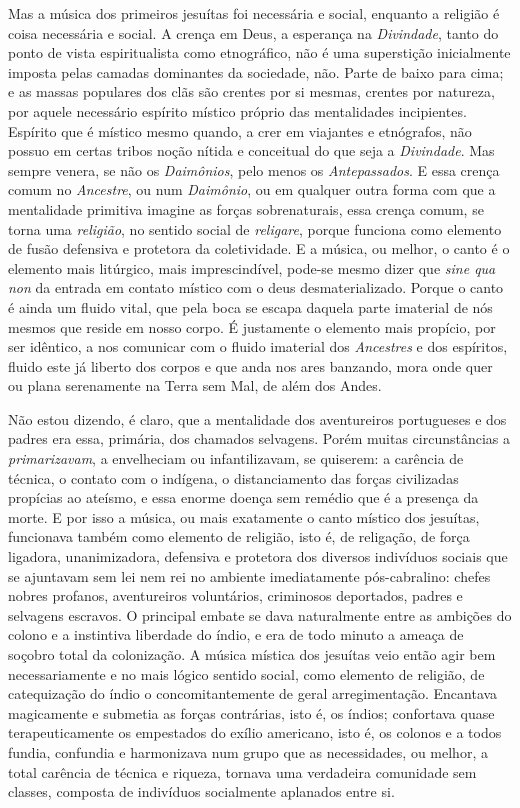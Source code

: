 Mas a música dos primeiros jesuítas foi necessária e social, enquanto a
religião é coisa necessária e social. A crença em Deus, a esperança na
\textit{Divindade}, tanto do ponto de vista espiritualista como etnográfico, não
é uma superstição inicialmente imposta pelas camadas dominantes da
sociedade, não. Parte de baixo para cima; e as massas populares dos clãs
são crentes por si mesmas, crentes por natureza, por aquele necessário
espírito místico próprio das mentalidades incipientes. Espírito que é
místico mesmo quando, a crer em viajantes e etnógrafos, não possuo em
certas tribos noção nítida e conceitual do que seja a \textit{Divindade}. Mas
sempre venera, se não os \textit{Daimônios}, pelo menos os \textit{Antepassados}. E essa
crença comum no \textit{Ancestre}, ou num \textit{Daimônio}, ou em qualquer outra forma
com que a mentalidade primitiva imagine as forças sobrenaturais, essa
crença comum, se torna uma \textit{religião}, no sentido social de \textit{religare},
porque funciona como elemento de fusão defensiva e protetora da
coletividade. E a música, ou melhor, o canto é o elemento mais
litúrgico, mais imprescindível, pode-se mesmo dizer que \textit{sine qua non} da
entrada em contato místico com o deus desmaterializado. Porque o canto é
ainda um fluido vital, que pela boca se escapa daquela parte imaterial
de nós mesmos que reside em nosso corpo. É justamente o elemento mais
propício, por ser idêntico, a nos comunicar com o fluido imaterial dos
\textit{Ancestres} e dos espíritos, fluido este já liberto dos corpos e que anda
nos ares banzando, mora onde quer ou plana serenamente na Terra sem Mal,
de além dos Andes.

Não estou dizendo, é claro, que a mentalidade dos aventureiros
portugueses e dos padres era essa, primária, dos chamados selvagens.
Porém muitas circunstâncias a \textit{primarizavam}, a envelheciam ou
infantilizavam, se quiserem: a carência de técnica, o contato com o
indígena, o distanciamento das forças civilizadas propícias ao ateísmo,
e essa enorme doença sem remédio que é a presença da morte. E por isso a
música, ou mais exatamente o canto místico dos jesuítas, funcionava
também como elemento de religião, isto é, de religação, de força
ligadora, unanimizadora, defensiva e protetora dos diversos indivíduos
sociais que se ajuntavam sem lei nem rei no ambiente imediatamente
pós-cabralino: chefes nobres profanos, aventureiros voluntários,
criminosos deportados, padres e selvagens escravos. O principal embate
se dava naturalmente entre as ambições do colono e a instintiva
liberdade do índio, e era de todo minuto a ameaça de soçobro total da
colonização. A música mística dos jesuítas veio então agir bem
necessariamente e no mais lógico sentido social, como elemento de
religião, de catequização do índio o concomitantemente de geral
arregimentação. Encantava magicamente e submetia as forças contrárias,
isto é, os índios; confortava quase terapeuticamente os empestados do
exílio americano, isto é, os colonos e a todos fundia, confundia e
harmonizava num grupo que as necessidades, ou melhor, a total carência
de técnica e riqueza, tornava uma verdadeira comunidade sem classes,
composta de indivíduos socialmente aplanados entre si.

